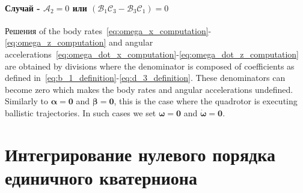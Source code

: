 \documentclass[12pt,a4paper,fleqn]{article}
\newcommand{\bVec}[1]{\mathbf{#1}}
\newcommand{\bodyrate}[0]{\omega} %
\newcommand{\bodyrates}[0]{\boldsymbol{\bodyrate}} %
\begin{document}
\paragraph{Случай - $\mathcal{A}_2 = 0$ или $\left( \mathcal{B}_1 \mathcal{C}_3 - \mathcal{B}_3 \mathcal{C}_1 \right) = 0$}

Решения of the body rates~\eqref{eq:omega_x_computation}-\eqref{eq:omega_z_computation} and angular accelerations~\eqref{eq:omega_dot_x_computation}-\eqref{eq:omega_dot_z_computation} are obtained by divisions where the denominator is composed of coefficients as defined in~\eqref{eq:b_1_definition}-\eqref{eq:d_3_definition}.
These denominators can become zero which makes the body rates and angular accelerations undefined.
Similarly to $\boldsymbol{\alpha} = \bVec{0}$ and $\boldsymbol{\beta} = \bVec{0}$, this is the case where the quadrotor is executing ballistic trajectories.
In such cases we set $\bodyrates = \bVec{0}$ and $\dot{\bodyrates} = \bVec{0}$.

\section{Интегрирование нулевого порядка единичного кватерниона} \label{sec:appquatint}
\end{document}

